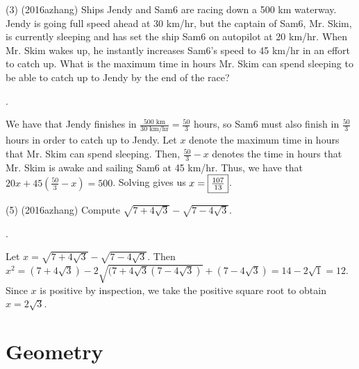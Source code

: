 \documentclass{article}
\begin{document}
\begin{problem}
(3) (2016azhang) Ships Jendy and Sam6 are racing down a 500 km waterway. Jendy is going full speed ahead at 30 km/hr, but the captain of Sam6, Mr. Skim, is currently sleeping and has set the ship Sam6 on autopilot at 20 km/hr. When Mr. Skim wakes up, he instantly increases Sam6's speed to 45 km/hr in an effort to catch up. What is the maximum time in hours Mr. Skim can spend sleeping to be able to catch up to Jendy by the end of the race?
\end{problem}

\begin{answer}
.
\end{answer}

\begin{solution}
We have that Jendy finishes in $\frac{500 \text{ km}}{30 \text{ km/hr}} = \frac{50}{3}$ hours, so Sam6 must also finish in $\frac{50}{3}$ hours in order to catch up to Jendy. Let $x$ denote the maximum time in hours that Mr. Skim can spend sleeping. Then, $\frac{50}{3} - x$ denotes the time in hours that Mr. Skim is awake and sailing Sam6 at 45 km/hr. Thus, we have that $20x + 45(\frac{50}{3}-x) = 500$. Solving gives us $x = \fbox{$\frac{107}{13}$}$.
\end{solution}

\begin{problem}
(5) (2016azhang) Compute $\sqrt{7+4\sqrt{3}} - \sqrt{7-4\sqrt{3}}$.
\end{problem}

\begin{answer}
.
\end{answer}

\begin{solution}
Let $x = \sqrt{7+4\sqrt{3}} - \sqrt{7-4\sqrt{3}}$. Then $x^2 = (7+4\sqrt{3}) - 2\sqrt{(7+4\sqrt{3}(7-4\sqrt{3})} + (7-4\sqrt{3}) = 14 - 2\sqrt{1} = 12$. Since $x$ is positive by inspection, we take the positive square root to obtain $x = 2\sqrt{3}$.
\end{solution}

\section{Geometry}
\end{document}

